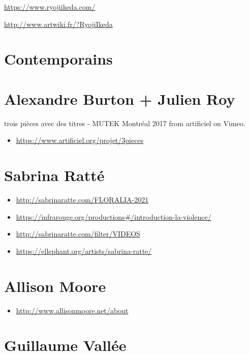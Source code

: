 \documentclass[
]{book}
\providecommand{\tightlist}{%
  \setlength{\itemsep}{0pt}\setlength{\parskip}{0pt}}
\begin{document}
\url{https://www.ryojiikeda.com/}

\url{http://www.artwiki.fr/?RyojiIkeda}

\hypertarget{contemporains}{%
\section{Contemporains}\label{contemporains}}

\hypertarget{alexandre-burton-julien-roy}{%
\section{Alexandre Burton + Julien Roy}\label{alexandre-burton-julien-roy}}

trois pièces avec des titres - MUTEK Montréal 2017 from artificiel on Vimeo.

\begin{itemize}
\tightlist
\item
  \url{https://www.artificiel.org/projet/3pieces}
\end{itemize}

\hypertarget{sabrina-rattuxe9}{%
\section{Sabrina Ratté}\label{sabrina-rattuxe9}}

\begin{itemize}
\tightlist
\item
  \url{http://sabrinaratte.com/FLORALIA-2021}
\item
  \url{https://infrarouge.org/productions\#/introduction-la-violence/}
\item
  \url{http://sabrinaratte.com/filter/VIDEOS}
\item
  \url{https://ellephant.org/artists/sabrina-ratte/}
\end{itemize}

\hypertarget{allison-moore}{%
\section{Allison Moore}\label{allison-moore}}

\begin{itemize}
\tightlist
\item
  \url{http://www.allisonmoore.net/about}
\end{itemize}

\hypertarget{guillaume-valluxe9e}{%
\section{Guillaume Vallée}\label{guillaume-valluxe9e}}
\end{document}
